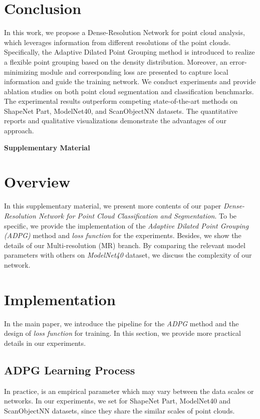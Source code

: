 \documentclass[10pt,twocolumn,letterpaper]{article}
\begin{document}
\section{Conclusion} In this work, we propose a Dense-Resolution Network for point cloud analysis, which leverages information from different resolutions of the point clouds. Specifically, the Adaptive Dilated Point Grouping method is introduced to realize a flexible point grouping based on the density distribution. Moreover, an error-minimizing module and corresponding loss are presented to capture local information and guide the training network. We conduct experiments and provide ablation studies on both point cloud segmentation and classification benchmarks. The experimental results outperform competing state-of-the-art methods on ShapeNet Part, ModelNet40, and ScanObjectNN datasets. The quantitative reports and qualitative visualizations demonstrate the advantages of our approach.
{\small


}
\clearpage
\appendix
\noindent\textbf{\Large{Supplementary Material}}
\section{Overview}
In this supplementary material, we present more contents of our paper \emph{Dense-Resolution Network for Point Cloud Classification and Segmentation}. To be specific, we provide the implementation of the \emph{Adaptive Dilated Point Grouping (ADPG)} method and \emph{loss function} for the experiments. Besides, we show the details of our Multi-resolution (MR) branch. By comparing the relevant model parameters with others on \emph{ModelNet40} dataset, we discuss the complexity of our network.
\section{Implementation}
In the main paper, we introduce the pipeline for the \emph{ADPG} method and the design of \emph{loss function} for training. In this section, we provide more practical details in our experiments.
\subsection{ADPG Learning Process}
In practice,  is an empirical parameter which may vary between the data scales or networks. In our experiments, we set  for ShapeNet Part, ModelNet40 and ScanObjectNN datasets, since they share the similar scales of point clouds. 
\end{document}
